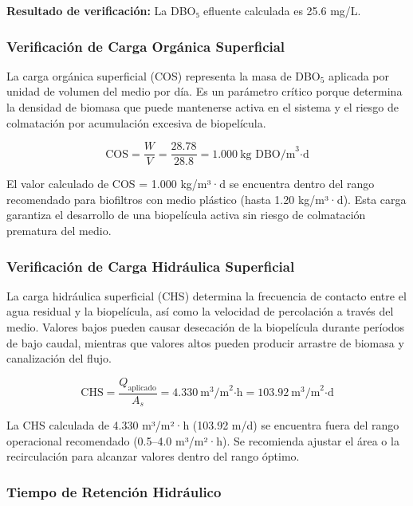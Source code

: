 \documentclass[12pt,a4paper]{article}
\begin{document}
\textbf{Resultado de verificación:} La DBO₅ efluente calculada es 25.6 mg/L.

\subsubsection*{Verificación de Carga Orgánica Superficial}

La carga orgánica superficial (COS) representa la masa de DBO$_5$ aplicada por unidad de volumen del medio por día. Es un parámetro crítico porque determina la densidad de biomasa que puede mantenerse activa en el sistema y el riesgo de colmatación por acumulación excesiva de biopelícula.

\begin{equation}
\text{COS} = \frac{W}{V} = \frac{28.78}{28.8} = 1.000\ \text{kg DBO/m}^3\text{·d}
\end{equation}

El valor calculado de COS = 1.000 kg/m³·d se encuentra dentro del rango recomendado para biofiltros con medio plástico (hasta 1.20 kg/m³·d). Esta carga garantiza el desarrollo de una biopelícula activa sin riesgo de colmatación prematura del medio.

\subsubsection*{Verificación de Carga Hidráulica Superficial}

La carga hidráulica superficial (CHS) determina la frecuencia de contacto entre el agua residual y la biopelícula, así como la velocidad de percolación a través del medio. Valores bajos pueden causar desecación de la biopelícula durante períodos de bajo caudal, mientras que valores altos pueden producir arrastre de biomasa y canalización del flujo.

\begin{equation}
\text{CHS} = \frac{Q_{\text{aplicado}}}{A_s} = 4.330\ \text{m}^3\text{/m}^2\text{·h} = 103.92\ \text{m}^3\text{/m}^2\text{·d}
\end{equation}

La CHS calculada de 4.330 m³/m²·h (103.92 m/d) se encuentra fuera del rango operacional recomendado (0.5--4.0 m³/m²·h). Se recomienda ajustar el área o la recirculación para alcanzar valores dentro del rango óptimo.

\subsubsection*{Tiempo de Retención Hidráulico}
\end{document}
